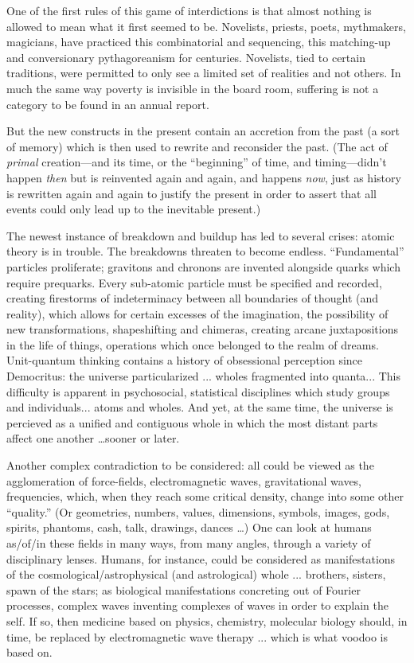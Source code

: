 One of the first rules of this game of interdictions is that almost nothing is allowed to mean what it first seemed to be. Novelists, priests, poets, mythmakers, magicians, have practiced this combinatorial and sequencing, this matching-up and conversionary pythagoreanism for centuries. Novelists, tied to certain traditions, were permitted to only see a limited set of realities and not others. In much the same way poverty is invisible in the board room, suffering is not a category to be found in an annual report.

But the new constructs in the present contain an accretion from the past (a sort of memory) which is then used to rewrite and reconsider the past. (The act of \emph{primal} creation---and its time, or the \enquote{beginning} of time, and timing---didn't happen \emph{then} but is reinvented again and again, and happens \emph{now}, just as history is rewritten again and again to justify the present in order to assert that all events could only lead up to the inevitable present.)

The newest instance of breakdown and buildup has led to several crises: atomic theory is in trouble. The breakdowns threaten to become endless. \enquote{Fundamental} particles proliferate; gravitons and chronons are invented alongside quarks which require prequarks. Every sub-atomic particle must be specified and recorded, creating firestorms of indeterminacy between all boundaries of thought (and reality), which allows for certain excesses of the imagination, the possibility of new transformations, shapeshifting and chimeras, creating arcane juxtapositions in the life of things, operations which once belonged to the realm of dreams. Unit-quantum thinking contains a history of obsessional perception since Democritus: the universe particularized ... wholes fragmented into quanta... This difficulty is apparent in psychosocial, statistical disciplines which study groups and individuals... atoms and wholes. And yet, at the same time, the universe is percieved as a unified and contiguous whole in which the most distant parts affect one another \ldots sooner or later.

Another complex contradiction to be considered: all could be viewed as the agglomeration of force-fields, electromagnetic waves, gravitational waves, frequencies, which, when they reach some critical density, change into some other \enquote{quality.} (Or geometries, numbers, values, dimensions, symbols, images, gods, spirits, phantoms, cash, talk, drawings, dances \ldots ) One can look at humans as\slash of\slash in these fields in many ways, from many angles, through a variety of disciplinary lenses. Humans, for instance, could be considered as manifestations of the cosmological/astrophysical (and astrological) whole ... brothers, sisters, spawn of the stars; as biological manifestations concreting out of Fourier processes, complex waves inventing complexes of waves in order to explain the self. If so, then medicine based on physics, chemistry, molecular biology should, in time, be replaced by electromagnetic wave therapy ... which is what voodoo is based on.

